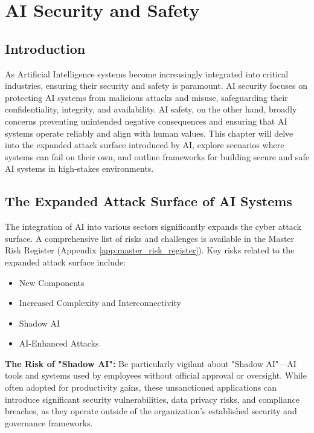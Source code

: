 \chapter{AI Security and Safety}
\label{chap:ai_security_and_safety}

\section{Introduction}
\label{sec:security_introduction}
As Artificial Intelligence systems become increasingly integrated into critical industries, ensuring their security and safety is paramount. AI security focuses on protecting AI systems from malicious attacks and misuse, safeguarding their confidentiality, integrity, and availability. AI safety, on the other hand, broadly concerns preventing unintended negative consequences and ensuring that AI systems operate reliably and align with human values. This chapter will delve into the expanded attack surface introduced by AI, explore scenarios where systems can fail on their own, and outline frameworks for building secure and safe AI systems in high-stakes environments.

\section{The Expanded Attack Surface of AI Systems}
\label{sec:attack_surface}

The integration of AI into various sectors significantly expands the cyber attack surface. A comprehensive list of risks and challenges is available in the Master Risk Register (Appendix \ref{app:master_risk_register}). Key risks related to the expanded attack surface include:

\begin{itemize}
    \item New Components
    \item Increased Complexity and Interconnectivity
    \item Shadow AI
    \item AI-Enhanced Attacks
\end{itemize}

\begin{warning}
\textbf{The Risk of "Shadow AI":} Be particularly vigilant about "Shadow AI"—AI tools and systems used by employees without official approval or oversight. While often adopted for productivity gains, these unsanctioned applications can introduce significant security vulnerabilities, data privacy risks, and compliance breaches, as they operate outside of the organization's established security and governance frameworks.
\end{warning}

